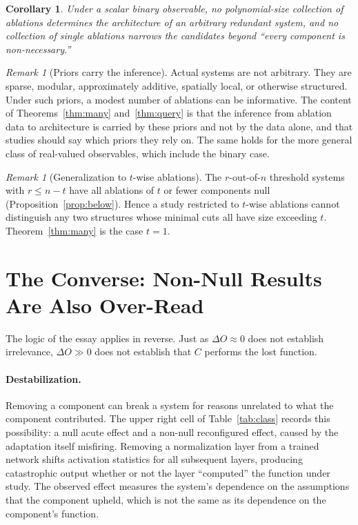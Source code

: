 \documentclass[11pt]{article}
\newtheorem{corollary}[theorem]{Corollary}
\theoremstyle{definition}
\theoremstyle{remark}
\newtheorem{remark}[theorem]{Remark}
\begin{document}
\begin{corollary}
Under a scalar binary observable, no polynomial-size collection of ablations determines the architecture of an arbitrary redundant system, and no collection of single ablations narrows the candidates beyond ``every component is non-necessary.''
\end{corollary}

\begin{remark}[Priors carry the inference]
Actual systems are not arbitrary. They are sparse, modular, approximately additive, spatially local, or otherwise structured. Under such priors, a modest number of ablations can be informative. The content of Theorems~\ref{thm:many} and~\ref{thm:query} is that the inference from ablation data to architecture is carried by these priors and not by the data alone, and that studies should say which priors they rely on. The same holds for the more general class of real-valued observables, which include the binary case.
\end{remark}

\begin{remark}[Generalization to $t$-wise ablations]
The $r$-out-of-$n$ threshold systems with $r\le n-t$ have all ablations of $t$ or fewer components null (Proposition~\ref{prop:below}). Hence a study restricted to $t$-wise ablations cannot distinguish any two structures whose minimal cuts all have size exceeding $t$. Theorem~\ref{thm:many} is the case $t=1$.
\end{remark}

\section{The Converse: Non-Null Results Are Also Over-Read}\label{sec:converse}

The logic of the essay applies in reverse. Just as $\Delta O\approx 0$ does not establish irrelevance, $\Delta O\gg 0$ does not establish that $C$ performs the lost function.

\paragraph{Destabilization.}
Removing a component can break a system for reasons unrelated to what the component contributed. The upper right cell of Table~\ref{tab:class} records this possibility: a null acute effect and a non-null reconfigured effect, caused by the adaptation itself misfiring. Removing a normalization layer from a trained network shifts activation statistics for all subsequent layers, producing catastrophic output whether or not the layer ``computed'' the function under study. The observed effect measures the system's dependence on the assumptions that the component upheld, which is not the same as its dependence on the component's function.
\end{document}
